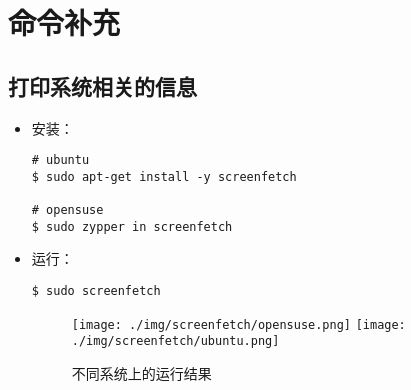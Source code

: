 \chapter{命令补充}

\section{打印系统相关的信息}
\begin{itemize}
\item 安装：
\begin{lstlisting}
# ubuntu 
$ sudo apt-get install -y screenfetch 

# opensuse 
$ sudo zypper in screenfetch
\end{lstlisting}

\item 运行：
\begin{lstlisting}
$ sudo screenfetch
\end{lstlisting}


\begin{figure}[htp]  
    \centering
    \texttt{[image: ./img/screenfetch/opensuse.png]}
    \texttt{[image: ./img/screenfetch/ubuntu.png]}
    \caption{不同系统上的运行结果} %
    \label{fig:screenfetch} %
\end{figure}
\end{itemize}

